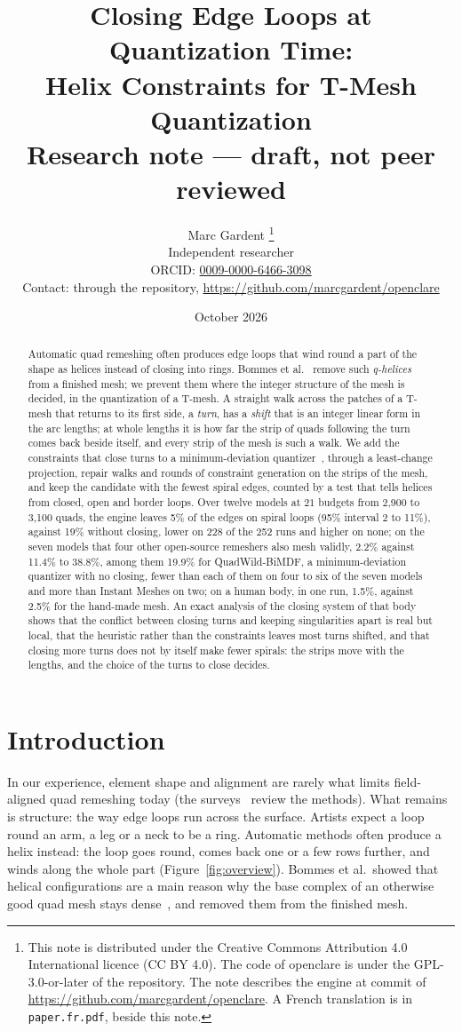 \documentclass[11pt,a4paper]{article}
\title{Closing Edge Loops at Quantization Time:\\
Helix Constraints for T-Mesh Quantization\\[0.5em]
\large Research note --- draft, not peer reviewed}
\author{Marc Gardent%
\thanks{This note is distributed under the Creative Commons Attribution
4.0 International licence (CC BY 4.0). The code of openclare is under the
GPL-3.0-or-later of the repository. The note describes the engine at commit
\texttt{\enginecommit} of \url{https://github.com/marcgardent/openclare}.
A French translation is in \texttt{paper.fr.pdf}, beside this note.}\\
\normalsize Independent researcher\\
\normalsize ORCID: \href{https://orcid.org/0009-0000-6466-3098}{0009-0000-6466-3098}\\
\normalsize Contact: through the repository,
\url{https://github.com/marcgardent/openclare}}
\date{October 2026}
\begin{document}
\maketitle

\begin{abstract}
Automatic quad remeshing often produces edge loops that wind round a part of
the shape as helices instead of closing into rings. Bommes et
al.~\cite{bommes2011structure} remove such \emph{q-helices} from a finished
mesh; we prevent them where the integer structure of the mesh is decided, in
the quantization of a T-mesh. A straight walk across the patches of a T-mesh
that returns to its first side, a \emph{turn}, has a \emph{shift} that is an
integer linear form in the arc lengths; at whole lengths it is how far the
strip of quads following the turn comes back beside itself, and every strip
of the mesh is such a walk. We add the constraints that close turns to a
minimum-deviation quantizer~\cite{heistermann2023bimdf}, through a
least-change projection, repair walks and rounds of constraint generation on
the strips of the mesh, and keep the candidate with the fewest spiral edges,
counted by a test that tells helices from closed, open and border loops. Over
twelve models at $21$ budgets from 2{,}900 to 3{,}100 quads, the engine leaves
5\% of the edges on spiral loops (95\% interval 2 to 11\%), against 19\%
without closing, lower on 228 of the 252 runs and higher on none; on the seven
models that four other open-source remeshers also mesh validly, 2.2\% against
11.4\% to 38.8\%, among them 19.9\% for QuadWild-BiMDF, a minimum-deviation
quantizer with no closing, fewer than each of them on four to six of the seven
models and more than Instant Meshes on two; on a human body, in one run,
1.5\%, against 2.5\% for the hand-made mesh.
An exact analysis of the closing system of that body shows that the conflict between closing
turns and keeping singularities apart is real but local, that the heuristic
rather than the constraints leaves most turns shifted, and that closing more
turns does not by itself make fewer spirals: the strips move with the
lengths, and the choice of the turns to close decides.
\end{abstract}

\section{Introduction}

In our experience, element shape and alignment are rarely what limits
field-aligned quad remeshing today (the
surveys~\cite{bommes2013survey,campen2017survey} review the methods). What remains is structure:
the way edge loops run across the surface. Artists expect a loop round an
arm, a leg or a neck to be a ring. Automatic methods often produce a helix
instead: the loop goes round, comes back one or a few rows further, and winds
along the whole part (Figure~\ref{fig:overview}). Bommes et al.\ showed that
helical configurations are a main reason why the base complex of an otherwise
good quad mesh stays dense~\cite{bommes2011structure}, and removed them from
the finished mesh.
\end{document}
